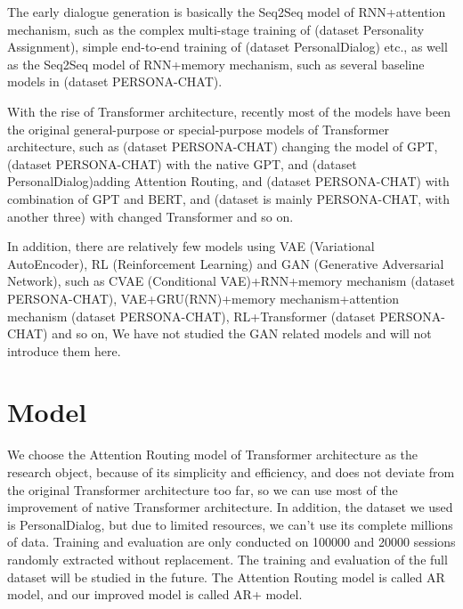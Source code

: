 \documentclass[letterpaper]{article} %
\DeclareRobustCommand{\citeext}[1]{\cite[#1]{#1}}
\begin{document}
The early dialogue generation is basically the Seq2Seq model\citeext{SutskeverGoogle2014} of RNN+attention mechanism\citeext{Bahdanau2015}, such as the complex multi-stage training of\citeext{Qian2017} (dataset Personality Assignment), simple end-to-end training of\citeext{Zheng2019a} (dataset PersonalDialog) etc., as well as the Seq2Seq model of RNN+memory mechanism\citeext{Sukhbaatar2015}, such as several baseline models in\citeext{Zhang2018} (dataset PERSONA-CHAT). 

With the rise of Transformer architecture, recently most of the models have been the original general-purpose or special-purpose models of Transformer architecture, such as\citeext{Tselousov2018} (dataset PERSONA-CHAT) changing the model of GPT\citeext{Radford2018}, \citeext{Wolf2019} (dataset PERSONA-CHAT) with the native GPT, and \citeext{Zheng2019} (dataset PersonalDialog)adding Attention Routing, and \citeext{Liu2020} (dataset PERSONA-CHAT) with combination of GPT and BERT, and \citeext{Roller2020} (dataset is mainly PERSONA-CHAT, with another three) with changed Transformer and so on. 

In addition, there are relatively few models using VAE (Variational AutoEncoder), RL (Reinforcement Learning) and GAN (Generative Adversarial Network), such as CVAE (Conditional VAE)+RNN+memory mechanism\citeext{Song2019} (dataset PERSONA-CHAT), VAE+GRU(RNN)+memory mechanism+attention mechanism\citeext{Xu2020} (dataset PERSONA-CHAT), RL+Transformer\citeext{Liu2020} (dataset PERSONA-CHAT) and so on, We have not studied the GAN related models and will not introduce them here. 

\section[Model]{Model} 

We choose the Attention Routing model of Transformer architecture\citeext{Zheng2019} as the research object, because of its simplicity and efficiency, and does not deviate from the original Transformer architecture too far, so we can use most of the improvement of native Transformer architecture. In addition, the dataset we used is PersonalDialog, but due to limited resources, we can't use its complete millions of data. Training and evaluation are only conducted on 100000 and 20000 sessions randomly extracted without replacement. The training and evaluation of the full dataset will be studied in the future. The Attention Routing model is called AR model, and our improved model is called AR+ model. 
\end{document}
